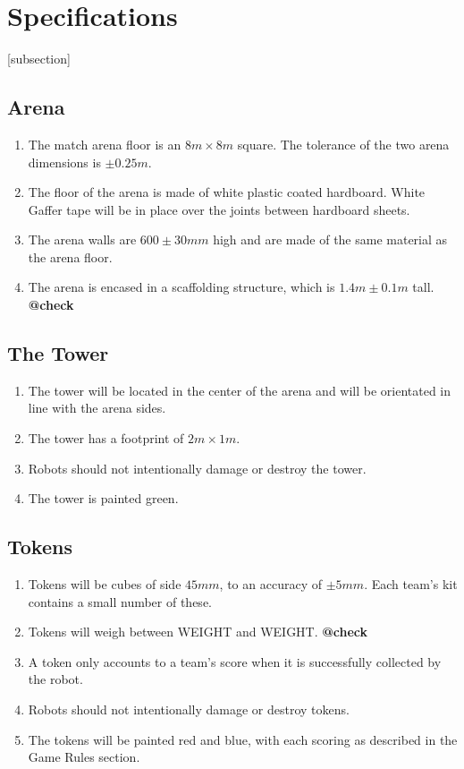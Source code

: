 \section{Specifications}
[subsection]
\newcommand{\rcnii}{\stepcounter{rulei}\arabic{section}.\arabic{subsection}.\arabic{rulei}}
\renewcommand{\labelenumi}{\rcnii}

\subsection{Arena}
\begin{enumerate}
\item The match arena floor is an $8m \times 8m$ square.
 The tolerance of the two arena dimensions is $\pm0.25m$.
\item The floor of the arena is made of white plastic coated hardboard.
 White Gaffer tape will be in place over the joints between hardboard sheets.
\item The arena walls are $600\pm30mm$ high and are made of the same material as the arena floor.
\item The arena is encased in a scaffolding structure, which is $1.4m \pm0.1m$ tall.	\textbf{@check}
\end{enumerate}

\subsection{The Tower}
\label{tower}
\begin {enumerate} 
\item The tower will be located in the center of the arena and will be orientated in line with the arena sides.
\item The tower has a footprint of $2m \times 1m$.
\item Robots should not intentionally damage or destroy the tower.
\item The tower is painted green.
\end {enumerate}

\subsection{Tokens}
\label{tokens}
\begin {enumerate} 
\item Tokens will be cubes of side $45mm$, to an accuracy of $\pm5mm$.
 Each team's kit contains a small number of these.
\item Tokens will weigh between WEIGHT and WEIGHT.	\textbf{@check}
\item A token only accounts to a team's score when it is successfully collected by the robot.
\item Robots should not intentionally damage or destroy tokens.
\item The tokens will be painted red and blue, with each scoring as described in the Game Rules section.
\end {enumerate}

